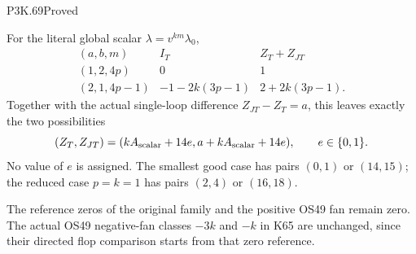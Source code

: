 \begin{statement}{P3K.69}{Proved}
\begin{enumerate}
For the literal global scalar \(\lambda=v^{km}\lambda_0\),
\[
\begin{array}{c|cc}
 (a,b,m)&I_T&Z_T+Z_{JT}\\\hline
 (1,2,4p)&0&1\\
 (2,1,4p-1)&-1-2k(3p-1)&2+2k(3p-1).
\end{array}
\]
Together with the actual single-loop difference \(Z_{JT}-Z_T=a\),
this leaves exactly the two possibilities
\[
 (Z_T,Z_{JT})=(kA_{\rm scalar}+14e,
                 a+kA_{\rm scalar}+14e),\qquad e\in\{0,1\}.
\]
No value of \(e\) is assigned. The smallest good case has pairs
\((0,1)\) or \((14,15)\); the reduced case \(p=k=1\) has pairs
\((2,4)\) or \((16,18)\).
\end{enumerate}
The reference zeros of the original family and the positive OS49
fan remain zero. The actual OS49 negative-fan classes \(-3k\) and
\(-k\) in K65 are unchanged, since their directed flop comparison
starts from that zero reference.
\end{statement}
